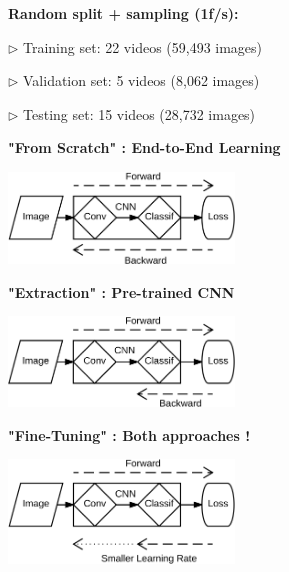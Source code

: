 \documentclass[landscape,a0paper,fontscale=0.292]{baposter}
\begin{document}
\begin{poster}
{\textbf{Random split + sampling (1f/s):}

$\triangleright$ Training set: 22 videos (59,493 images)

$\triangleright$ Validation set: 5 videos (8,062 images)

$\triangleright$ Testing set: 15 videos (28,732 images)

\vspace{.1cm}

\textbf{"From Scratch" : End-to-End Learning}

\vspace{-.3cm}

\begin{center}
\includegraphics[width=6cm]{../slides/images/FromScratch.png}
\end{center}

\vspace{-.3cm}

\textbf{"Extraction" : Pre-trained CNN}

\vspace{-.3cm}

\begin{center}
\includegraphics[width=6cm]{../slides/images/Extraction.png}
\end{center}

\vspace{-.3cm}

\textbf{"Fine-Tuning" : Both approaches !}

\vspace{-.3cm}

\begin{center}
\includegraphics[width=6cm]{../slides/images/FineTuning.png}
\end{center}



}
\end{poster}
\end{document}
